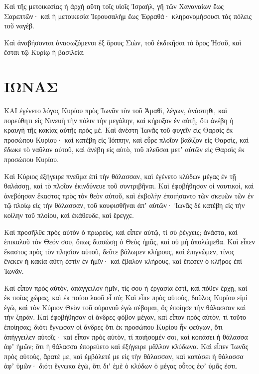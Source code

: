 \begin{spacing}{1.1}
\begin{multicols}{2}
Καὶ τῆς μετοικεσίας ἡ ἀρχὴ αὕτη τοῖς υἱοῖς Ἰσραὴλ, γῆ τῶν Χαναναίων ἕως Σαρεπτῶν· καὶ ἡ μετοικεσία Ἱερουσαλὴμ ἕως Ἐφραθά· κληρονομήσουσι τὰς πόλεις τοῦ ναγέβ.

Καὶ ἀναβήσονται ἀνασωζόμενοι ἐξ ὄρους Σιὼν, τοῦ ἐκδικῆσαι τὸ ὄρος Ἡσαῦ, καὶ ἔσται τῷ Κυρίῳ ἡ βασιλεία.


\end{multicols}
\chapter{ΙΩΝΑΣ}
\begin{multicols}{2}

ΚΑΙ ἐγένετο λόγος Κυρίου πρὸς Ἰωνᾶν τὸν τοῦ Ἀμαθὶ, λέγων,
ἀνάστηθι, καὶ πορεύθητι εἰς Νινευὴ τὴν πόλιν τὴν μεγάλην, καὶ κήρυξον ἐν αὐτῇ, ὅτι ἀνέβη ἡ κραυγὴ τῆς κακίας αὐτῆς πρὸς μέ.
Καὶ ἀνέστη Ἰωνᾶς τοῦ φυγεῖν εἰς Θαρσὶς ἐκ προσώπου Κυρίου· καὶ κατέβη εἰς Ἰόππην, καὶ εὗρε πλοῖον βαδίζον εἰς Θαρσὶς, καὶ ἔδωκε τὸ ναῦλον αὐτοῦ, καὶ ἀνέβη εἰς αὐτὸ, τοῦ πλεῦσαι μετʼ αὐτῶν εἰς Θαρσὶς ἐκ προσώπου Κυρίου.

Καὶ Κύριος ἐξήγειρε πνεῦμα ἐπὶ τὴν θάλασσαν, καὶ ἐγένετο κλύδων μέγας ἐν τῇ θαλάσσῃ, καὶ τὸ πλοῖον ἐκινδύνευε τοῦ συντριβῆναι.
Καὶ ἐφοβήθησαν οἱ ναυτικοὶ, καὶ ἀνεβόησαν ἕκαστος πρὸς τὸν θεὸν αὐτοῦ, καὶ ἐκβολὴν ἐποιήσαντο τῶν σκευῶν τῶν ἐν τῷ πλοίῳ εἰς τὴν θάλασσαν, τοῦ κουφισθῆναι ἀπʼ αὐτῶν· Ἰωνᾶς δὲ κατέβη εἰς τὴν κοίλην τοῦ πλοίου, καὶ ἐκάθευδε, καὶ ἔρεγχε.

Καὶ προσῆλθε πρὸς αὐτὸν ὁ πρωρεὺς, καὶ εἶπεν αὐτῷ, τί σὺ ῥέγχεις; ἀνάστα, καὶ ἐπικαλοῦ τὸν Θεόν σου, ὅπως διασώσῃ ὁ Θεὸς ἡμᾶς, καὶ οὐ μὴ ἀπολώμεθα.
Καὶ εἶπεν ἕκαστος πρὸς τὸν πλησίον αὐτοῦ, δεῦτε βάλωμεν κλήρους, καὶ ἐπιγνῶμεν, τίνος ἕνεκεν ἡ κακία αὕτη ἐστὶν ἐν ἡμῖν· καὶ ἔβαλον κλήρους, καὶ ἔπεσεν ὁ κλῆρος ἐπὶ Ἰωνᾶν.

Καὶ εἶπον πρὸς αὐτὸν, ἀπάγγειλον ἡμῖν, τίς σου ἡ ἐργασία ἐστὶ, καὶ πόθεν ἔρχῃ, καὶ ἐκ ποίας χώρας, καὶ ἐκ ποίου λαοῦ εἶ σύ;
Καὶ εἶπε πρὸς αὐτοὺς, δοῦλος Κυρίου εἰμὶ ἐγὼ, καὶ τὸν Κύριον Θεὸν τοῦ οὐρανοῦ ἐγὼ σέβομαι, ὃς ἐποίησε τὴν θάλασσαν καὶ τὴν ξηράν.
Καὶ ἐφοβήθησαν οἱ ἄνδρες φόβον μέγαν, καὶ εἶπον πρὸς αὐτὸν, τί τοῦτο ἐποίησας; διότι ἔγνωσαν οἱ ἄνδρες ὅτι ἐκ προσώπου Κυρίου ἦν φεύγων, ὅτι ἀπήγγειλεν αὐτοῖς·
καὶ εἶπον πρὸς αὐτὸν, τί ποιήσομέν σοι, καὶ κοπάσει ἡ θάλασσα ἀφʼ ἡμῶν; ὅτι ἡ θάλασσα ἐπορεύετο καὶ ἐξήγειρε μᾶλλον κλύδωνα.
Καὶ εἶπεν Ἰωνᾶς πρὸς αὐτοὺς, ἄρατέ με, καὶ ἐμβάλετέ με εἰς τὴν θάλασσαν, καὶ κοπάσει ἡ θάλασσα ἀφʼ ὑμῶν· διότι ἔγνωκα ἐγὼ, ὅτι διʼ ἐμὲ ὁ κλύδων ὁ μέγας οὗτος ἐφʼ ὑμᾶς ἐστι.


\end{multicols}
\end{spacing}
